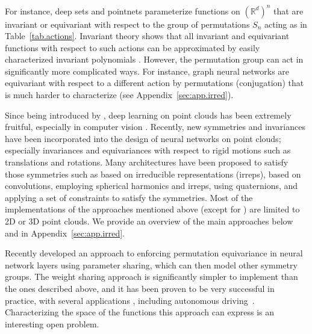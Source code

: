 \documentclass{article}
\theoremstyle{Hogg}
\begin{document}
For instance, deep sets and pointnets parameterize functions on $(\mathbb R^d)^n $ that are invariant or equivariant with respect to the group of permutations $S_n$ acting  as in Table~\ref{tab.actions}. Invariant theory shows that all invariant and equivariant functions with respect to such actions can be approximated by easily characterized invariant polynomials \cite{weyl}. However, the permutation group can act in significantly more complicated ways. For instance, graph neural networks are equivariant with respect to a different action by permutations (conjugation) that is much harder to characterize (see Appendix~\ref{sec:app.irred}).

Since being introduced by \cite{qi2017pointnet, zaheer2017deep}, deep learning on point clouds has been extremely fruitful, especially in computer vision \cite{guo2020deep}. Recently, new symmetries and invariances have been incorporated into the design of neural networks on point clouds; especially invariances and equivariances with respect to rigid motions such as translations and rotations.
Many architectures have been proposed to satisfy those symmetries such as \cite{thomas2018tensor} based on irreducible representations (irreps), \cite{kondor2018covariant, zhang2019rotation} based on convolutions, \cite{fuchs2020se} employing spherical harmonics and irreps, \cite{zhao2020quaternion} using quaternions, and \cite{finzi2021practical} applying a set of constraints to satisfy the symmetries. Most of the implementations of the approaches mentioned above (except for \cite{finzi2021practical}) are limited to 2D or 3D point clouds.
We provide an overview of the main approaches below and in Appendix~\ref{sec:app.irred}.

Recently \cite{ravanbakhsh2017sharing} developed an approach to enforcing permutation equivariance in neural network layers using parameter sharing, which can then model other symmetry groups. The weight sharing approach is significantly simpler to implement than the ones described above, and it has been proven to be very successful in practice, with several applications \cite{wang2020towards, wang2021incorporating}, including autonomous driving~\cite{huang2021traffic}. Characterizing the space of the functions this approach can express is an interesting open problem. 
\end{document}
